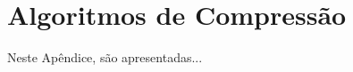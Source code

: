 
\chapter{Algoritmos de Compressão}
\label{apd:3:complementacao}

Neste Apêndice, são apresentadas...


